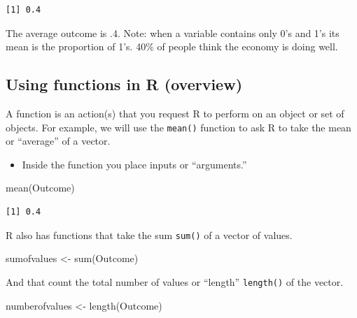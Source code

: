 \documentclass[
  letterpaper,
  DIV=11,
  numbers=noendperiod]{scrreprt}
\newenvironment{Shaded}{\begin{snugshade}}{\end{snugshade}}
\newcommand{\FunctionTok}[1]{\textcolor[rgb]{0.28,0.35,0.67}{#1}}
\newcommand{\NormalTok}[1]{\textcolor[rgb]{0.00,0.23,0.31}{#1}}
\newcommand{\OtherTok}[1]{\textcolor[rgb]{0.00,0.23,0.31}{#1}}
\providecommand{\tightlist}{%
  \setlength{\itemsep}{0pt}\setlength{\parskip}{0pt}}\usepackage{longtable,booktabs,array}
\begin{document}
\begin{verbatim}
[1] 0.4
\end{verbatim}

The average outcome is .4. Note: when a variable contains only 0's and
1's its mean is the proportion of 1's. 40\% of people think the economy
is doing well.

\hypertarget{using-functions-in-r-overview}{%
\subsection{Using functions in R
(overview)}\label{using-functions-in-r-overview}}

A function is an action(s) that you request R to perform on an object or
set of objects. For example, we will use the \texttt{mean()} function to
ask R to take the mean or ``average'' of a vector.

\begin{itemize}
\tightlist
\item
  Inside the function you place inputs or ``arguments.''
\end{itemize}

\begin{Shaded}
\begin{Highlighting}[]
\FunctionTok{mean}\NormalTok{(Outcome)}
\end{Highlighting}
\end{Shaded}

\begin{verbatim}
[1] 0.4
\end{verbatim}

R also has functions that take the sum \texttt{sum()} of a vector of
values.

\begin{Shaded}
\begin{Highlighting}[]
\NormalTok{sumofvalues }\OtherTok{\textless{}{-}} \FunctionTok{sum}\NormalTok{(Outcome)}
\end{Highlighting}
\end{Shaded}

And that count the total number of values or ``length''
\texttt{length()} of the vector.

\begin{Shaded}
\begin{Highlighting}[]
\NormalTok{numberofvalues }\OtherTok{\textless{}{-}} \FunctionTok{length}\NormalTok{(Outcome)}
\end{Highlighting}
\end{Shaded}
\end{document}
